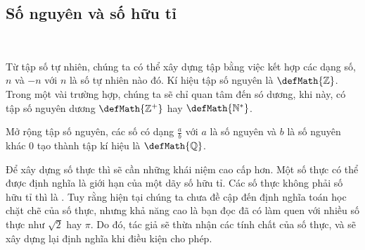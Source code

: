 \subsection{Số nguyên và số hữu tỉ}

\ %

Từ tập số tự nhiên, chúng ta có thể xây dựng tập  bằng việc kết hợp các dạng số, $n$ và $-n$ với $n$ là số tự nhiên nào đó. Kí hiệu tập số nguyên là $\defMath{\mathbb{Z}}$. Trong một vài trường hợp, chúng ta sẽ chỉ quan tâm đến só dương, khi này, có tập số nguyên dương $\defMath{\mathbb{Z}^+}$ hay $\defMath{\mathbb{N}^*}$.

Mở rộng tập số nguyên, các số có dạng $\frac{a}{b}$ với $a$ là số nguyên và $b$ là số nguyên khác $0$ tạo thành tập  kí hiệu là $\defMath{\mathbb{Q}}$.

Để xây dựng số thực thì sẽ cần những khái niệm cao cấp hơn. Một số thực có thể được định nghĩa là giới hạn của một dãy số hữu tỉ. Các số thực không phải số hữu tỉ thì là . Tuy rằng hiện tại chúng ta chưa đề cập đến định nghĩa toán học chặt chẽ của số thực, nhưng khả năng cao là bạn đọc đã có làm quen với nhiều số thực như $\sqrt{2}$ hay $\pi$. Do đó, tác giả sẽ thừa nhận các tính chất của số thực, và sẽ xây dựng lại định nghĩa khi điều kiện cho phép.
